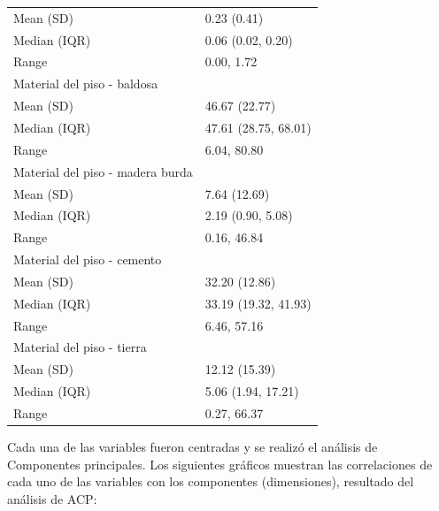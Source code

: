 \begin{table}
\begin{tabular}{ll}
\addlinespace
\hspace{1em}Mean (SD) & 0.23 (0.41)\\
\hspace{1em}Median (IQR) & 0.06 (0.02, 0.20)\\
\hspace{1em}Range & 0.00, 1.72\\
Material del piso - baldosa & \\
\hspace{1em}Mean (SD) & 46.67 (22.77)\\
\addlinespace
\hspace{1em}Median (IQR) & 47.61 (28.75, 68.01)\\
\hspace{1em}Range & 6.04, 80.80\\
Material del piso - madera burda & \\
\hspace{1em}Mean (SD) & 7.64 (12.69)\\
\hspace{1em}Median (IQR) & 2.19 (0.90, 5.08)\\
\addlinespace
\hspace{1em}Range & 0.16, 46.84\\
Material del piso - cemento & \\
\hspace{1em}Mean (SD) & 32.20 (12.86)\\
\hspace{1em}Median (IQR) & 33.19 (19.32, 41.93)\\
\hspace{1em}Range & 6.46, 57.16\\
\addlinespace
Material del piso - tierra & \\
\hspace{1em}Mean (SD) & 12.12 (15.39)\\
\hspace{1em}Median (IQR) & 5.06 (1.94, 17.21)\\
\hspace{1em}Range & 0.27, 66.37\\
\bottomrule
\end{tabular}
\endgroup{}
\end{table}

Cada una de las variables fueron centradas y se realizó el análisis de
Componentes principales. Los siguientes gráficos muestran las
correlaciones de cada uno de las variables con los componentes
(dimensiones), resultado del análisis de ACP:

